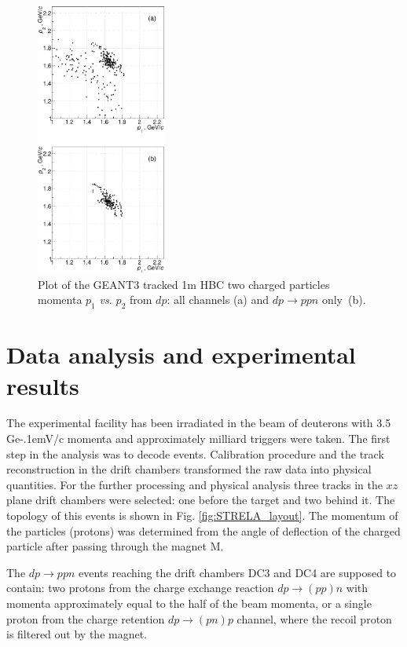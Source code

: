 \documentclass[twocolumn,epjc3]{svjour3}
\newcommand{\dpfrag} {\ensuremath{dp \rightarrow ppn}\xspace}
\newcommand{\dpchex} {\ensuremath{dp \rightarrow (pp)n}\xspace}
\newcommand{\dpret}  {\ensuremath{dp \rightarrow (pn)p}\xspace}
\newcommand{\GeVc}   {Ge\kern-.1emV/c\xspace}
\begin{document}
\begin{figure}[t]
  \centering
  \includegraphics[width=0.38\textwidth]{p1_vs_p2_1.pdf} %
  \caption{Plot of the GEANT3 tracked 1m HBC two charged particles momenta
    $p_1$ \textit{vs.} $p_2$ from $dp$: all channels (a) and \dpfrag only~(b).}
  \label{fig:p1vsp2_sim}
\end{figure}

\section{Data analysis and experimental results}
The experimental facility has been irradiated in the beam of deuterons with 3.5
\GeVc momenta and approximately milliard triggers were taken. The first step in
the analysis was to decode events. Calibration procedure and the track
reconstruction in the drift chambers transformed the raw data into physical
quantities. For the further processing and physical analysis three tracks in the
$xz$ plane drift chambers were selected: one before the target and two behind
it. The topology of this events is shown in Fig. \ref{fig:STRELA_layout}. The
momentum of the particles (protons) was determined from the angle of deflection
of the charged particle after passing through the magnet M.

The \dpfrag events reaching the drift chambers DC3 and DC4 are supposed
to contain: two protons from the charge exchange reaction \dpchex with momenta
approximately equal to the half of the beam momenta, or a single proton from the
charge retention \dpret channel, where the recoil proton is filtered out by the
magnet.
\end{document}
